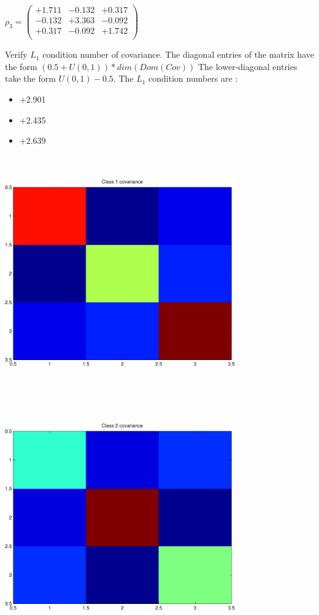 \documentclass[12pt]{article}
\theoremstyle{definition}
\theoremstyle{remark}
\numberwithin{equation}{section}
\begin{document}
$\rho_3 = \left(
\begin{array}{
ccc}
+1.711 & -0.132 & +0.317 \\
-0.132 & +3.363 & -0.092 \\
+0.317 & -0.092 & +1.742 \\
\end{array}
\right)$

Verify $L_1$ condition number of covariance. The diagonal entries of the matrix have the form $(0.5 + U(0,1) )*dim(Dom(Cov))$
The lower-diagonal entries take the form $U(0,1) - 0.5$. 
The $L_1$ condition numbers are :
\begin{itemize}
\item +2.901
\item +2.435
\item +2.639
\end{itemize}
\includegraphics[width=10.0cm,height=10.0cm]{rv1_corr.pdf}

\includegraphics[width=10.0cm,height=10.0cm]{rv2_corr.pdf}
\end{document}
